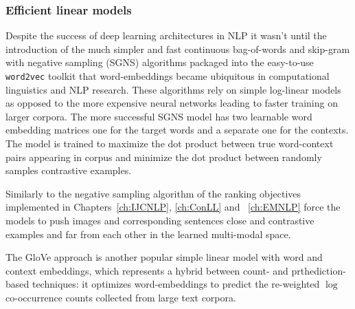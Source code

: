 



\subsubsection{Efficient linear models}
\label{sec:w2v}
Despite the success of deep learning architectures in NLP it wasn't until the introduction
of the much simpler and fast continuous bag-of-words
and skip-gram with negative sampling (SGNS) algorithms \cite{mikolov2013efficient}
packaged into the easy-to-use \texttt{word2vec}
toolkit that
word-embeddings became ubiquitous in computational linguistics and NLP research.
These algorithms rely on simple log-linear models as opposed to the more expensive
neural networks leading to faster training on larger corpora. The more successful SGNS
model has two learnable word embedding matrices one for the target words
and a separate one for the contexts.
The model is trained to maximize the dot product
between true word-context pairs appearing in corpus and minimize the
dot product between randomly
samples contrastive examples. 


Similarly to the negative sampling algorithm of  \cite{mikolov2013efficient} the ranking objectives
implemented in Chapters~\ref{ch:IJCNLP}, \ref{ch:ConLL} and ~\ref{ch:EMNLP}
force the models to push images and corresponding sentences close and contrastive examples
and far from each other in the learned multi-modal space.

The GloVe approach \citep{pennington2014glove} is another popular simple linear model
with word  and context embeddings, which
represents a hybrid between count- and prthediction-based techniques:
it optimizes word-embeddings to predict the re-weighted
$\log$ co-occurrence counts collected from large text corpora.

